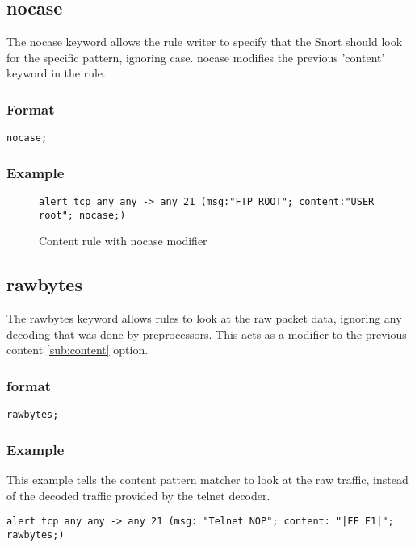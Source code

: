 \documentclass[english]{report}
\begin{document}
\subsection{nocase}

The nocase keyword allows the rule writer to specify that the Snort should look
for the specific pattern, ignoring case.  nocase modifies the previous 'content' keyword in the rule.

\subsubsection{Format}

\begin{verbatim}
nocase;
\end{verbatim}

\subsubsection{Example}
\begin{figure}[!hbpt]
\begin{verbatim}
alert tcp any any -> any 21 (msg:"FTP ROOT"; content:"USER root"; nocase;)
\end{verbatim}

\caption{\label{content nocase mod example}Content rule with nocase modifier}
\end{figure}

\subsection{rawbytes \label{sub:rawbytes}}

The rawbytes keyword allows rules to look at the raw packet data, ignoring any
decoding that was done by preprocessors.  This acts as a modifier to the
previous content \ref{sub:content} option. 

\subsubsection{format}

\begin{verbatim}
rawbytes;
\end{verbatim}

\subsubsection{Example}

This example tells the content pattern matcher to look at the raw traffic,
instead of the decoded traffic provided by the telnet decoder.
\begin{verbatim}
alert tcp any any -> any 21 (msg: "Telnet NOP"; content: "|FF F1|"; rawbytes;)
\end{verbatim}
\end{document}
